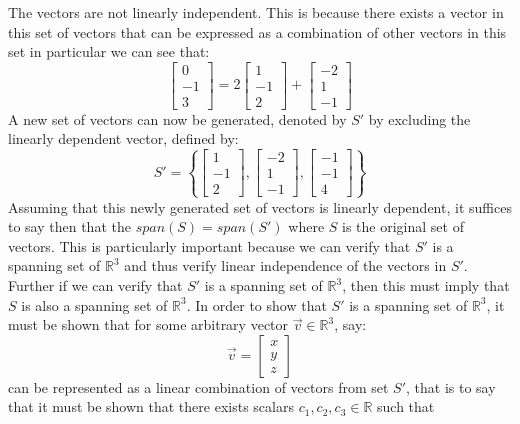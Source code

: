\documentclass{report}
\begin{document}
\sol The vectors are not linearly independent.  This is because there exists a vector in this set of vectors that can be expressed as a combination of other vectors in this set in particular we can see that:
$$
\begin{bmatrix} 0 \\ -1 \\ 3 \end{bmatrix} =
2\begin{bmatrix} 1 \\ -1 \\ 2 \end{bmatrix} +
\begin{bmatrix} -2 \\ 1 \\ -1 \end{bmatrix}
$$
A new set of vectors can now be generated,  denoted by $S'$ by excluding the linearly dependent vector,  defined by:
$$
S' = \left\{
\left[\begin{array}{c}
1 \\
-1 \\
2
\end{array}\right],\left[\begin{array}{c}
-2 \\
1 \\
-1
\end{array}\right],\left[\begin{array}{c}
-1 \\
-1 \\
4
\end{array}\right]
\right\}
$$ 
Assuming that this newly generated set of vectors is linearly dependent,  it suffices to say then that the $span(S) = span(S')$ where $S$ is the original set of vectors.  This is particularly important because we can verify that $S'$ is a spanning set of $\mathbb{R}^3$ and thus verify linear independence of the vectors in $S'$.  Further if we can verify that $S'$ is a spanning set of $\mathbb{R}^3$,  then this must imply that $S$ is also a spanning set of $\mathbb{R}^3$.  In order to show that $S'$ is a spanning set of $\mathbb{R}^3$,  it must be shown that for some arbitrary vector $\vec{v}\in\mathbb{R}^3$,  say:
$$
\vec{v} =
\begin{bmatrix}
x \\ y \\ z
\end{bmatrix}
$$
can be represented as a linear combination of vectors from set $S'$,  that is to say that it must be shown that there exists scalars $c_1,c_2,c_3\in\mathbb{R}$ such that
\end{document}
